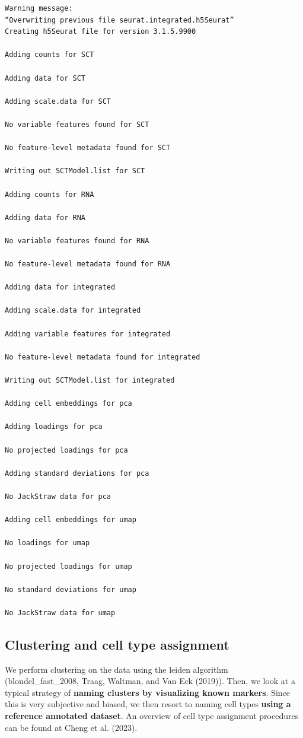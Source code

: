 \documentclass[
  letterpaper,
  DIV=11,
  numbers=noendperiod]{scrartcl}
\begin{document}
\begin{verbatim}
Warning message:
“Overwriting previous file seurat.integrated.h5Seurat”
Creating h5Seurat file for version 3.1.5.9900

Adding counts for SCT

Adding data for SCT

Adding scale.data for SCT

No variable features found for SCT

No feature-level metadata found for SCT

Writing out SCTModel.list for SCT

Adding counts for RNA

Adding data for RNA

No variable features found for RNA

No feature-level metadata found for RNA

Adding data for integrated

Adding scale.data for integrated

Adding variable features for integrated

No feature-level metadata found for integrated

Writing out SCTModel.list for integrated

Adding cell embeddings for pca

Adding loadings for pca

No projected loadings for pca

Adding standard deviations for pca

No JackStraw data for pca

Adding cell embeddings for umap

No loadings for umap

No projected loadings for umap

No standard deviations for umap

No JackStraw data for umap
\end{verbatim}

\hypertarget{clustering-and-cell-type-assignment}{%
\subsection{Clustering and cell type
assignment}\label{clustering-and-cell-type-assignment}}

We perform clustering on the data using the leiden algorithm
(blondel\_fast\_2008, Traag, Waltman, and Van Eck (2019)). Then, we look
at a typical strategy of \textbf{naming clusters by visualizing known
markers}. Since this is very subjective and biased, we then resort to
naming cell types \textbf{using a reference annotated dataset}. An
overview of cell type assignment procedures can be found at Cheng et al.
(2023).
\end{document}
